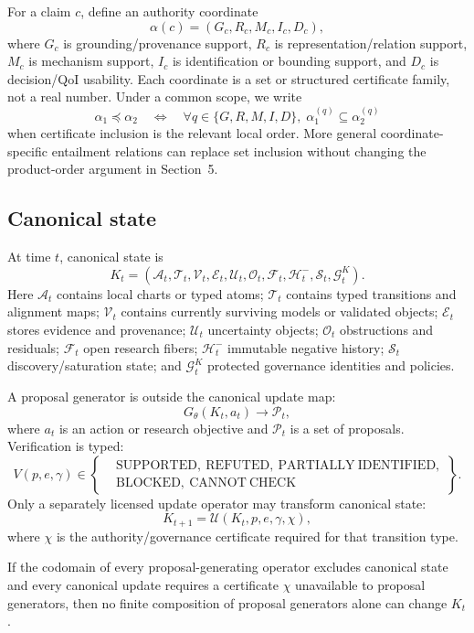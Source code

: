 For a claim \(c\), define an authority coordinate
\[
\alpha(c)=(G_c,R_c,M_c,I_c,D_c),
\]
where \(G_c\) is grounding/provenance support, \(R_c\) is representation/relation support, \(M_c\) is mechanism support, \(I_c\) is identification or bounding support, and \(D_c\) is decision/QoI usability. Each coordinate is a set or structured certificate family, not a real number. Under a common scope, we write
\[
\alpha_1\preceq\alpha_2
\quad\Longleftrightarrow\quad
\forall q\in\{G,R,M,I,D\},\; \alpha_1^{(q)}\subseteq \alpha_2^{(q)}
\]
when certificate inclusion is the relevant local order. More general coordinate-specific entailment relations can replace set inclusion without changing the product-order argument in Section~5.

\subsection{Canonical state}

At time \(t\), canonical state is
\[
K_t=(\mathcal A_t,\mathcal T_t,\mathcal V_t,\mathcal E_t,\mathcal U_t,
\mathcal O_t,\mathcal F_t,\mathcal H_t^{-},\mathcal S_t,\mathcal G_t^K).
\]
Here \(\mathcal A_t\) contains local charts or typed atoms; \(\mathcal T_t\) contains typed transitions and alignment maps; \(\mathcal V_t\) contains currently surviving models or validated objects; \(\mathcal E_t\) stores evidence and provenance; \(\mathcal U_t\) uncertainty objects; \(\mathcal O_t\) obstructions and residuals; \(\mathcal F_t\) open research fibers; \(\mathcal H_t^{-}\) immutable negative history; \(\mathcal S_t\) discovery/saturation state; and \(\mathcal G_t^K\) protected governance identities and policies.

A proposal generator is outside the canonical update map:
\[
G_\theta(K_t,a_t)\longrightarrow \mathcal P_t,
\]
where \(a_t\) is an action or research objective and \(\mathcal P_t\) is a set of proposals. Verification is typed:
\[
V(p,e,\gamma)\in
\left\{
\begin{aligned}
&\mathrm{SUPPORTED},\ \mathrm{REFUTED},\ \mathrm{PARTIALLY\ IDENTIFIED},\\
&\mathrm{BLOCKED},\ \mathrm{CANNOT\ CHECK}
\end{aligned}
\right\}.
\]
Only a separately licensed update operator may transform canonical state:
\[
K_{t+1}=\mathcal U(K_t,p,e,\gamma,\chi),
\]
where \(\chi\) is the authority/governance certificate required for that transition type.

\begin{proposition}
If the codomain of every proposal-generating operator excludes canonical state and every canonical update requires a certificate \(\chi\) unavailable to proposal generators, then no finite composition of proposal generators alone can change \(K_t\).
\end{proposition}

